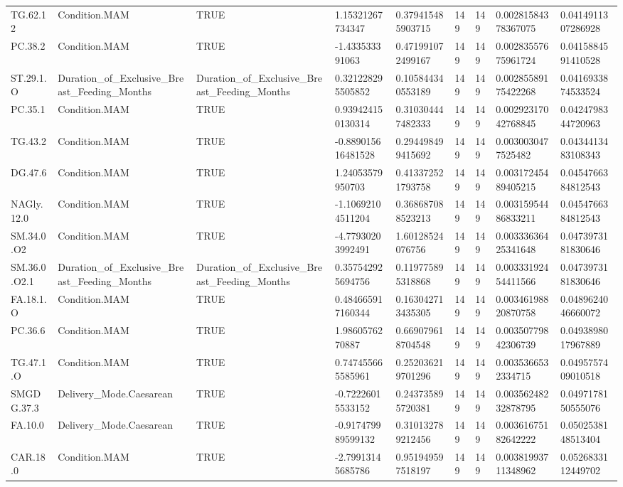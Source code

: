 \begin{longtable}{lllllllll}
TG.62.12 & Condition.MAM & TRUE & 1.15321267734347 & 0.379415485903715 & 149 & 149 & 0.00281584378367075 & 0.0414911307286928 \\
PC.38.2 & Condition.MAM & TRUE & -1.433533391063 & 0.471991072499167 & 149 & 149 & 0.00283557675961724 & 0.0415884591410528 \\
ST.29.1.O & Duration\_of\_Exclusive\_Breast\_Feeding\_Months & Duration\_of\_Exclusive\_Breast\_Feeding\_Months & 0.321228295505852 & 0.105844340553189 & 149 & 149 & 0.00285589175422268 & 0.0416933874533524 \\
PC.35.1 & Condition.MAM & TRUE & 0.939424150130314 & 0.310304447482333 & 149 & 149 & 0.00292317042768845 & 0.0424798344720963 \\
TG.43.2 & Condition.MAM & TRUE & -0.889015616481528 & 0.294498499415692 & 149 & 149 & 0.0030030477525482 & 0.0434413483108343 \\
DG.47.6 & Condition.MAM & TRUE & 1.24053579950703 & 0.413372521793758 & 149 & 149 & 0.00317245489405215 & 0.0454766384812543 \\
NAGly.12.0 & Condition.MAM & TRUE & -1.10692104511204 & 0.368687088523213 & 149 & 149 & 0.00315954486833211 & 0.0454766384812543 \\
SM.34.0.O2 & Condition.MAM & TRUE & -4.77930203992491 & 1.60128524076756 & 149 & 149 & 0.00333636425341648 & 0.0473973181830646 \\
SM.36.0.O2.1 & Duration\_of\_Exclusive\_Breast\_Feeding\_Months & Duration\_of\_Exclusive\_Breast\_Feeding\_Months & 0.357542925694756 & 0.119775895318868 & 149 & 149 & 0.00333192454411566 & 0.0473973181830646 \\
FA.18.1.O & Condition.MAM & TRUE & 0.484665917160344 & 0.163042713435305 & 149 & 149 & 0.00346198820870758 & 0.0489624046660072 \\
PC.36.6 & Condition.MAM & TRUE & 1.9860576270887 & 0.669079618704548 & 149 & 149 & 0.00350779842306739 & 0.0493898017967889 \\
TG.47.1.O & Condition.MAM & TRUE & 0.747455665585961 & 0.252036219701296 & 149 & 149 & 0.0035366532334715 & 0.0495757409010518 \\
SMGDG.37.3 & Delivery\_Mode.Caesarean & TRUE & -0.72226015533152 & 0.243735895720381 & 149 & 149 & 0.00356248232878795 & 0.0497178150555076 \\
FA.10.0 & Delivery\_Mode.Caesarean & TRUE & -0.917479989599132 & 0.310132789212456 & 149 & 149 & 0.00361675182642222 & 0.0502538148513404 \\
CAR.18.0 & Condition.MAM & TRUE & -2.79913145685786 & 0.951949597518197 & 149 & 149 & 0.00381993711348962 & 0.0526833112449702 \\

\end{longtable}
